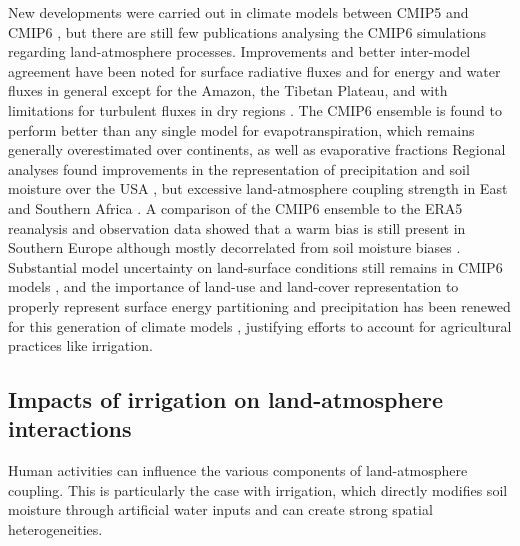 New developments were carried out in climate models between CMIP5 and CMIP6 \citep[e.g.][]{lawrence_community_2019, cheruy_improved_2020}, but there are still few publications analysing the CMIP6 simulations regarding land-atmosphere processes. Improvements and better inter-model agreement have been noted for surface radiative fluxes \citep{wild_global_2020} and for energy and water fluxes in general except for the Amazon, the Tibetan Plateau, and with limitations for turbulent fluxes in dry regions \citep{li_evaluation_2021}. The CMIP6 ensemble is found to perform better than any single model for evapotranspiration, which remains generally overestimated over continents, as well as evaporative fractions \citep{wang_evaluation_2021, yuan_understanding_2022}
Regional analyses found improvements in the representation of precipitation and soil moisture over the USA \citep{srivastava_evaluation_2020, yuan_historical_2021}, but excessive land-atmosphere coupling strength in East and Southern Africa \citep{mwanthi_representation_2024}. A comparison of the CMIP6 ensemble to the ERA5 reanalysis and observation data showed that a warm bias is still present in Southern Europe although mostly decorrelated from soil moisture biases \citep{osso_assessment_2023}. 
Substantial model uncertainty on land-surface conditions still remains in CMIP6 models \citep{yuan_historical_2021}, and the importance of land-use and land-cover representation to properly represent surface energy partitioning and precipitation has been renewed for this generation of climate models \citep{devanand_land_2020,singh_land-use_2024}, justifying efforts to account for agricultural practices like irrigation.

\subsection{Impacts of irrigation on land-atmosphere interactions}
\label{sec:irrig_landatmosphere}
Human activities can influence the various components of land-atmosphere coupling. This is particularly the case with irrigation, which directly modifies soil moisture through artificial water inputs and can create strong spatial heterogeneities. 

